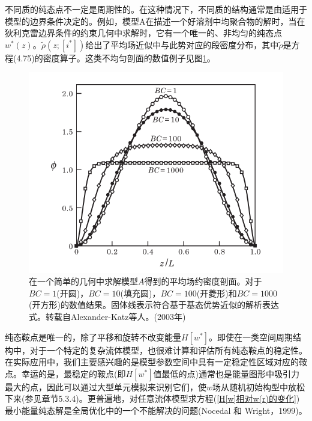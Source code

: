 不同质的纯态点不一定是周期性的。在这种情况下，不同质的结构通常是由适用于模型的边界条件决定的。例如，模型A在描述一个好溶剂中均聚合物的解时，当在狄利克雷边界条件的约束几何中求解时，它有一个唯一的、非均匀的纯态点$w^*(z)$。$\tilde{\rho}(z;[i^*])$给出了平均场近似中与此势对应的段密度分布，其中$\tilde{\rho}$是方程(4.75)的密度算子。这类不均匀剖面的数值例子见图\ref{剖面}。
\begin{figure}[H]
       \centering
        \includegraphics[width=12cm]{./figures/2.png}
       \caption{在一个简单的几何中求解模型$A$得到的平均场约密度剖面。对于$BC=1$(开圆)，$BC=10$(填充圆)，$BC=100$(开菱形)和$BC=1000$(开方形)的数值结果。固体线表示符合基于基态优势近似的解析表达式。转载自Alexander-Katz等人。(2003年)}
        \label{剖面}
 \end{figure}

纯态鞍点是唯一的，除了平移和旋转不改变能量$H[w^*]$。即使在一类空间周期结构中，对于一个特定的复杂流体模型，也很难计算和评估所有纯态鞍点的稳定性。在实际应用中，我们主要感兴趣的是模型参数空间中具有一定稳定性区域对应的鞍点。幸运的是，最稳定的鞍点(即$H[w^*]$值最低的点)通常也是能量图形中吸引力最大的点，因此可以通过大型单元模拟来识别它们，使$w$场从随机初始构型中放松下来(参见章节5.3.4)。更普遍地，对任意流体模型求方程(\ref{H[w]相对w(r)的变化})最小能量纯态解是全局优化中的一个不能解决的问题(Nocedal 和 Wright，1999)。\\

